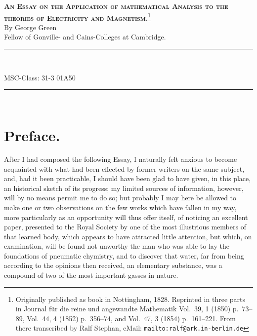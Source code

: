 \documentclass[12pt,notitlepage]{amsart}
\def\Crule{\begin{center}\rule[.5ex]{5em}{.2pt}\\[10pt]\end{center}}
\begin{document}
\thispagestyle{empty}
\begin{center}
\textsc{\bf An Essay on the Application of mathematical Analysis to the 
theories of Electricity and Magnetism.}\footnote{Originally 
published as book in Nottingham, 1828. Reprinted in three parts in Journal f\"ur die reine und angewandte Mathematik
Vol.~39, 1 (1850) p.~73--89, Vol.~44, 4 (1852) p.~356--74, and Vol.~47, 3 (1854)
p.~161--221.
From there transcribed by Ralf Stephan,
eMail: \texttt{mailto:ralf@ark.in-berlin.de}}\\[5pt]
{\small By George Green}\\[5pt]
{\small Fellow of Gonville- and Cains-Colleges at Cambridge.}\\
\rule[.5ex]{10em}{.2pt}\\[10pt]
\end{center}

\bigskip

MSC-Class: 31-3 01A50
\Crule

\section{Preface.}
After I had composed the following Essay, I naturally felt anxious to
become acquainted with what had been effected by former writers on the same
subject, and, had it been practicable, I should have been glad to have given,
in this place, an historical sketch of its progress; my limited sources of information,
however, will by no means permit me to do so; but probably I may here be
allowed to make one or two observations on the few works which have fallen
in my way, more particularly as an opportunity will thus offer itself, of 
noticing an excellent paper, presented to the Royal Society by one of the most
illustrious members of that learned body, which appears to have attracted little
attention, but which, on examination, will be found not unworthy the man who
was able to lay the foundations of pneumatic chymistry, and to discover that
water, far from being according to the opinions then received, an elementary
substance, was a compound of two of the most important gasses in nature.
\end{document}
